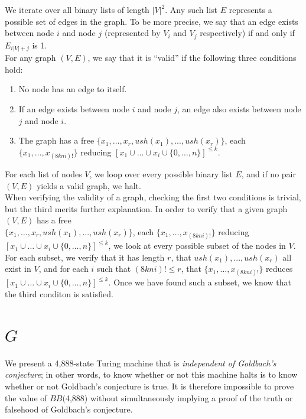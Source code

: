 \documentclass[11pt]{article}
\newcommand{\gbstatenumstate}{4,888-state }
\newcommand{\bbgbstatenum}{$BB($4,888) }
\begin{document}
We iterate over all binary lists of length $|V|^2$. Any such list $E$ represents a possible set of edges in the graph. To be more precise, we say that an edge exists between node $i$ and node $j$ (represented by $V_i$ and $V_j$ respectively) if and only if $E_{i|V| + j}$ is 1. \\

For any graph $(V, E)$, we say that it is ``valid'' if the following three conditions hold:

\begin{enumerate}

\item No node has an edge to itself.
\item If an edge exists between node $i$ and node $j$, an edge also exists between node $j$ and node $i$.
\item The graph has a free $\{x_1,\dots,x_r, ush(x_1),...,ush(x_r)\}$, each  $\{x_1, \dots, x_{(8kni)!}\}$ reducing $[x_1 \cup \dots \cup x_i \cup \{0,\dots,n\}]^{\le k}$.

\end{enumerate}

For each list of nodes $V$, we loop over every possible binary list $E$, and if no pair $(V, E)$ yields a valid graph, we halt. \\

When verifying the validity of a graph, checking the first two conditions is trivial, but the third merits further explanation. In order to verify that a given graph $(V, E)$ has a free \\ $\{x_1,\dots,x_r, ush(x_1),...,ush(x_r)\}$, each  $\{x_1, \dots, x_{(8kni)!}\}$ reducing $[x_1 \cup \dots \cup x_i \cup \{0,\dots,n\}]^{\le k}$, we look at every possible subset of the nodes in $V$. For each subset, we verify that it has length $r$, that $ush(x_1),...,ush(x_r)$ all exist in $V$, and for each $i$ such that $(8kni)! \le r$, that $\{x_1, \dots, x_{(8kni)!}\}$ reduces $[x_1 \cup \dots \cup x_i \cup \{0,\dots,n\}]^{\le k}$. Once we have found such a subset, we know that the third conditon is satisfied.

\section{$G$}

We present a \gbstatenumstate Turing machine that is \emph{independent of Goldbach's conjecture}; in other words, to know whether or not this machine halts is to know whether or not Goldbach's conjecture is true. It is therefore impossible to prove the value of \bbgbstatenum without simultaneously implying a proof of the truth or falsehood of Goldbach's conjecture.
\end{document}
